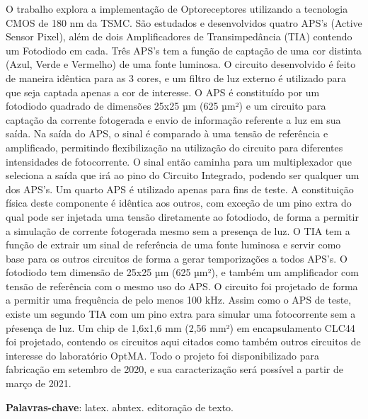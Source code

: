 
\setlength{\absparsep}{18pt} %
\begin{resumo}

O trabalho explora a implementação de Optoreceptores utilizando a tecnologia CMOS de 180 nm da TSMC. São estudados e desenvolvidos quatro APS’s (Active Sensor Pixel), além de dois Amplificadores de Transimpedância (TIA) contendo um Fotodiodo em cada.
Três APS’s tem a função de captação de uma cor distinta (Azul, Verde e Vermelho) de uma fonte luminosa. O circuito desenvolvido é feito de maneira idêntica para as 3 cores, e um filtro de luz externo é utilizado para que seja captada apenas a cor de interesse. O APS é constituído por um fotodiodo quadrado de dimensões 25x25 µm (625 µm²) e um circuito para captação da corrente fotogerada e envio de informação referente a luz em sua saída. Na saída do APS, o sinal é comparado à uma tensão de referência e amplificado, permitindo flexibilização na utilização do circuito para diferentes intensidades de fotocorrente. O sinal então caminha para um multiplexador que seleciona a saída que irá ao pino do Circuito Integrado, podendo ser qualquer um dos APS’s.
Um quarto APS é utilizado apenas para fins de teste. A constituição física deste componente é idêntica aos outros, com exceção de um pino extra do qual pode ser injetada uma tensão diretamente ao fotodiodo, de forma a permitir a simulação de corrente fotogerada mesmo sem a presença de luz.
O TIA tem a função de extrair um sinal de referência de uma fonte luminosa e servir como base para os outros circuitos de forma a gerar temporizações a todos APS’s. O fotodiodo tem dimensão de 25x25 µm (625 µm²), e também um amplificador com tensão de referência com o mesmo uso do APS. O circuito foi projetado de forma a permitir uma frequência de pelo menos 100 kHz. Assim como o APS de teste, existe um segundo TIA com um pino extra para simular uma fotocorrente sem a pŕesença de luz.
Um chip de 1,6x1,6 mm (2,56 mm²) em encapsulamento CLC44 foi projetado, contendo os circuitos aqui citados como também outros circuitos de interesse do laboratório OptMA. Todo o projeto foi disponibilizado para fabricação em setembro de 2020, e sua caracterização será possível a partir de março de 2021.


 \textbf{Palavras-chave}: latex. abntex. editoração de texto.
\end{resumo}